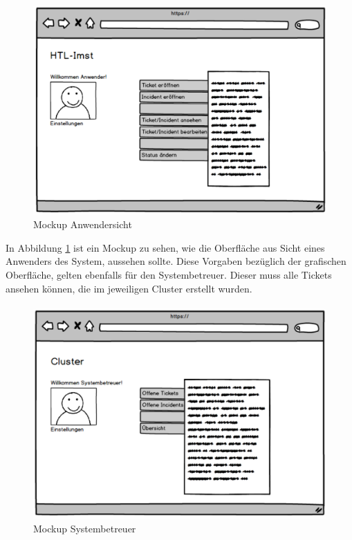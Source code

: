 \begin{figure}[h]
	\centering
	\includegraphics[scale=0.44]{figures/Wireframe_Anwender.png}
	\caption{Mockup Anwendersicht}
	\label{Abb_Mockup_Anwendersicht}
\end{figure}

In Abbildung \ref{Abb_Mockup_Anwendersicht} ist ein Mockup zu sehen, wie die Oberfläche aus Sicht eines Anwenders des System, aussehen sollte.
\newpage
Diese Vorgaben bezüglich der grafischen Oberfläche, gelten ebenfalls für den Systembetreuer. Dieser muss alle Tickets ansehen können, die im jeweiligen Cluster erstellt wurden.
\paragraph{}

\vspace{-.5cm}
\begin{figure}[h]
	\centering
	\includegraphics[scale=0.399]{figures/Wireframe_Systembetreuer.png}
	\caption{Mockup Systembetreuer}
	\label{Abb_Mockup_Systembetreuer}
\end{figure}

